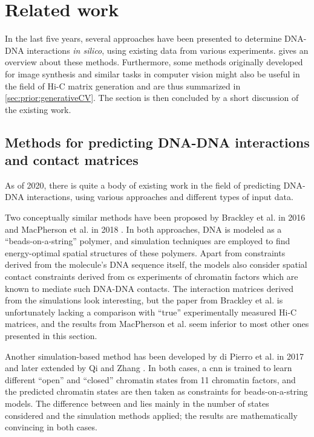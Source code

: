 \section{Related work}
In the last five years, several approaches have been presented to determine DNA-DNA interactions \emph{in silico}, 
using existing data from various experiments.  gives an overview about these methods.
Furthermore, some methods originally developed for image synthesis and similar tasks in computer vision might also be useful 
in the field of Hi-C matrix generation and are thus summarized in \autoref{sec:prior:generativeCV}.
The section is then concluded by a short discussion of the existing work.

\subsection{Methods for predicting DNA-DNA interactions and contact matrices} \label{sec:prior:predictingInteractions}
As of 2020, there is quite a body of existing work in the field of predicting DNA-DNA interactions, 
using various approaches and different types of input data.

Two conceptually similar methods have been proposed by Brackley et al. in 2016 and MacPherson et al. in 2018 \cite{Brackley2016, MacPherson2018}.
In both approaches, DNA is modeled as a ``beads-on-a-string'' polymer, and simulation techniques are employed to
find energy-optimal spatial structures of these polymers.
Apart from constraints derived from the molecule's DNA sequence itself, the models also consider spatial contact constraints derived from \acrshort{cs} experiments
of chromatin factors which are known to mediate such DNA-DNA contacts.
The interaction matrices derived from the simulations look interesting, 
but the paper from Brackley et al. \cite{Brackley2016} is unfortunately lacking a comparison with ``true'' experimentally measured Hi-C matrices, 
and the results from MacPherson et al. \cite{MacPherson2018} seem inferior to most other ones presented in this section.

Another simulation-based method has been developed by di Pierro et al. in 2017 \cite{Pierro2017} and later extended by Qi and Zhang \cite{Qi2019}. 
In both cases, a \acrfull{cnn} is trained to learn different ``open'' and ``closed'' chromatin states from 11 chromatin factors, 
and the predicted chromatin states are then taken as constraints for beads-on-a-string models.
The difference between \cite{Pierro2017} and \cite{Qi2019} lies mainly in the number of states considered and the simulation methods applied;
the results are mathematically convincing in both cases.

